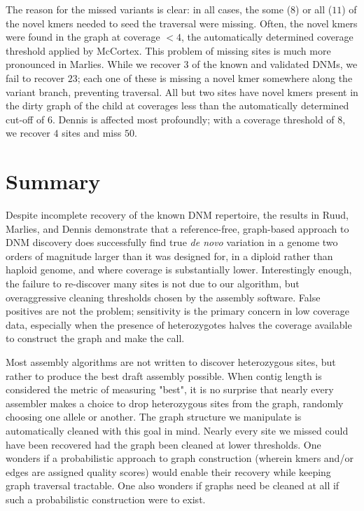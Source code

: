 The reason for the missed variants is clear: in all cases, the some ($8$) or all ($11$) of the novel kmers needed to seed the traversal were missing.  Often, the novel kmers were found in the graph at coverage $< 4$, the automatically determined coverage threshold applied by McCortex.  This problem of missing sites is much more pronounced in Marlies.  While we recover $3$ of the known and validated DNMs, we fail to recover $23$; each one of these is missing a novel kmer somewhere along the variant branch, preventing traversal.  All but two sites have novel kmers present in the dirty graph of the child at coverages less than the automatically determined cut-off of $6$.  Dennis is affected most profoundly; with a coverage threshold of $8$, we recover $4$ sites and miss $50$.

\section{Summary}

Despite incomplete recovery of the known DNM repertoire, the results in Ruud, Marlies, and Dennis demonstrate that a reference-free, graph-based approach to DNM discovery does successfully find true \textit{de novo} variation in a genome two orders of magnitude larger than it was designed for, in a diploid rather than haploid genome, and where coverage is substantially lower.  Interestingly enough, the failure to re-discover many sites is not due to our algorithm, but overaggressive cleaning thresholds chosen by the assembly software.  False positives are not the problem; sensitivity is the primary concern in low coverage data, especially when the presence of heterozygotes halves the coverage available to construct the graph and make the call.

Most assembly algorithms are not written to discover heterozygous sites, but rather to produce the best draft assembly possible.  When contig length is considered the metric of measuring "best", it is no surprise that nearly every assembler makes a choice to drop heterozygous sites from the graph, randomly choosing one allele or another.  The graph structure we manipulate is automatically cleaned with this goal in mind.  Nearly every site we missed could have been recovered had the graph been cleaned at lower thresholds.  One wonders if a probabilistic approach to graph construction (wherein kmers and/or edges are assigned quality scores) would enable their recovery while keeping graph traversal tractable.  One also wonders if graphs need be cleaned at all if such a probabilistic construction were to exist.

